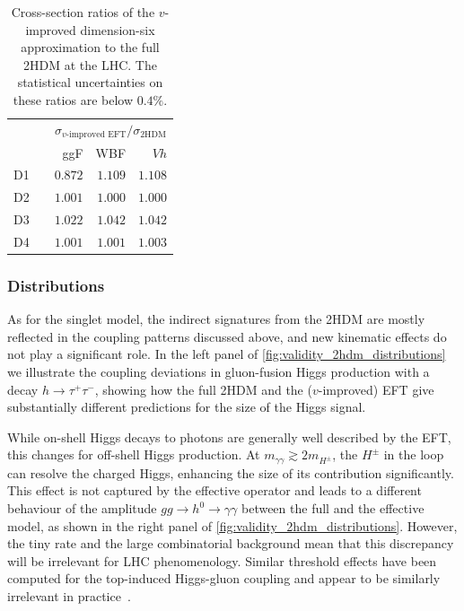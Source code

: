 \begin{table}[t]
    \begin{tabular}{c c rrr}
      \toprule
      \multirow{2}{*}{}
      && \multicolumn{3}{c}{$\sigma_\text{$v$-improved EFT} / \sigma_\text{2HDM}$} \\
      \cmidrule{3-5}
      && ggF & WBF & $Vh$ \\
      \midrule
      D1 && $0.872$ & $1.109$ & $1.108$ \\
      D2 && $1.001$ & $1.000$ & $1.000$ \\
      D3 && $1.022$ & $1.042$ & $1.042$ \\
      D4 && $1.001$ & $1.001$ & $1.003$ \\
      \bottomrule
    \end{tabular}
    \caption[Total Higgs production rates in the 2HDM]{Cross-section ratios
      of the $v$-improved dimension-six
      approximation to the full 2HDM at the LHC. The statistical
      uncertainties on these ratios are below $0.4\%$.}
  \label{tbl:validity_2HDM_rates}
\end{table}



\subsubsection{Distributions}

As for the singlet model, the indirect signatures from the 2HDM are mostly
reflected in the coupling patterns discussed above, and new
kinematic effects do not play a significant role.  In the left panel of
\autoref{fig:validity_2hdm_distributions} we illustrate the coupling
deviations in gluon-fusion Higgs production with a decay
$h\to \tau^+ \tau^-$, showing how the full 2HDM and the ($v$-improved)
EFT give substantially different predictions for the size of the Higgs
signal.

While on-shell Higgs decays to photons are generally well described by
the EFT, this changes for off-shell Higgs production. At
$m_{\gamma \gamma} \gtrsim 2 m_{H^\pm}$, the $H^\pm$ in the loop can
resolve the charged Higgs, enhancing the size of its contribution
significantly. This effect is not captured by the effective operator
and leads to a different behaviour of the amplitude
$g g \to h^0 \to \gamma \gamma$ between the full and the effective model,
as shown in the right panel of
\autoref{fig:validity_2hdm_distributions}. However, the tiny rate
and the large combinatorial background mean that this discrepancy will
be irrelevant for LHC phenomenology. Similar threshold effects have
been computed for the top-induced Higgs-gluon coupling and appear to
be similarly irrelevant in practice~\cite{Buschmann:2014twa}.


